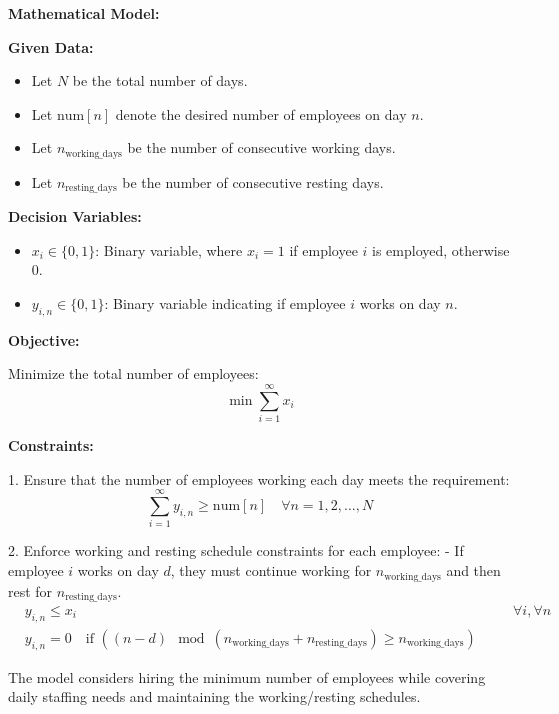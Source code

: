 \documentclass{article}
\begin{document}
\textbf{Mathematical Model:}

\textbf{Given Data:}
\begin{itemize}
    \item Let \( N \) be the total number of days.
    \item Let \( \text{num}[n] \) denote the desired number of employees on day \( n \).
    \item Let \( n_{\text{working\_days}} \) be the number of consecutive working days.
    \item Let \( n_{\text{resting\_days}} \) be the number of consecutive resting days.
\end{itemize}

\textbf{Decision Variables:}
\begin{itemize}
    \item \( x_i \in \{0, 1\} \): Binary variable, where \( x_i = 1 \) if employee \( i \) is employed, otherwise 0.
    \item \( y_{i,n} \in \{0, 1\} \): Binary variable indicating if employee \( i \) works on day \( n \).
\end{itemize}

\textbf{Objective:}

Minimize the total number of employees:
\[
\min \sum_{i=1}^{\infty} x_i
\]

\textbf{Constraints:}

1. Ensure that the number of employees working each day meets the requirement:
\[
\sum_{i=1}^{\infty} y_{i,n} \geq \text{num}[n] \quad \forall n = 1, 2, \ldots, N
\]

2. Enforce working and resting schedule constraints for each employee:
   - If employee \( i \) works on day \( d \), they must continue working for \( n_{\text{working\_days}} \) and then rest for \( n_{\text{resting\_days}} \).
\[
\begin{aligned}
    &y_{i,n} \leq x_i &&\quad \forall i, \forall n \\
    &y_{i,n} = 0 \quad \text{if } \left((n - d) \mod (n_{\text{working\_days}} + n_{\text{resting\_days}}) \geq n_{\text{working\_days}}\right)
\end{aligned}
\]

The model considers hiring the minimum number of employees while covering daily staffing needs and maintaining the working/resting schedules.
\end{document}
